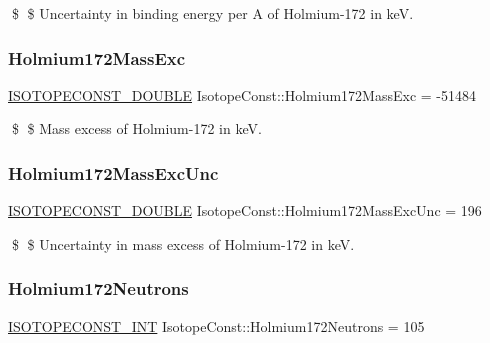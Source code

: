 \$ \$ Uncertainty in binding energy per A of Holmium-\/172 in keV. \mbox{\label{group___isotope_const-_holmium-_ho172_ga7a5c200a27214ae497de5bfcd2324598}} 
\subsubsection{\texorpdfstring{Holmium172\+Mass\+Exc}{Holmium172MassExc}}
{\footnotesize\ttfamily \mbox{\hyperlink{group___isotope_const-_macros_ga8f45a7272ce02c0b4c65c44636ed719a}{I\+S\+O\+T\+O\+P\+E\+C\+O\+N\+S\+T\+\_\+\+D\+O\+U\+B\+LE}} Isotope\+Const\+::\+Holmium172\+Mass\+Exc = -\/51484}

\$ \$ Mass excess of Holmium-\/172 in keV. \mbox{\label{group___isotope_const-_holmium-_ho172_gad11cecec7400c0112d2256884280b5b4}} 
\subsubsection{\texorpdfstring{Holmium172\+Mass\+Exc\+Unc}{Holmium172MassExcUnc}}
{\footnotesize\ttfamily \mbox{\hyperlink{group___isotope_const-_macros_ga8f45a7272ce02c0b4c65c44636ed719a}{I\+S\+O\+T\+O\+P\+E\+C\+O\+N\+S\+T\+\_\+\+D\+O\+U\+B\+LE}} Isotope\+Const\+::\+Holmium172\+Mass\+Exc\+Unc = 196}

\$ \$ Uncertainty in mass excess of Holmium-\/172 in keV. \mbox{\label{group___isotope_const-_holmium-_ho172_ga9eb827edcd4a7df73db5a8748290f678}} 
\subsubsection{\texorpdfstring{Holmium172\+Neutrons}{Holmium172Neutrons}}
{\footnotesize\ttfamily \mbox{\hyperlink{group___isotope_const-_macros_ga5f18360b3e99483a35c32d789e62621c}{I\+S\+O\+T\+O\+P\+E\+C\+O\+N\+S\+T\+\_\+\+I\+NT}} Isotope\+Const\+::\+Holmium172\+Neutrons = 105}

